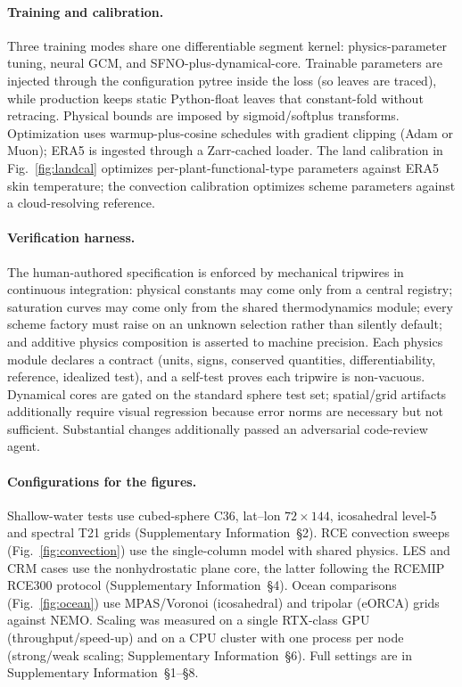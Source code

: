 \documentclass[11pt]{article}
\begin{document}
\paragraph{Training and calibration.}
Three training modes share one differentiable segment kernel: physics-parameter tuning, neural
GCM, and SFNO-plus-dynamical-core. Trainable parameters are injected through the configuration
pytree inside the loss (so leaves are traced), while production keeps static Python-float leaves
that constant-fold without retracing. Physical bounds are imposed by sigmoid/softplus transforms.
Optimization uses warmup-plus-cosine schedules with gradient clipping (Adam\cite{KingmaBa2015} or
Muon\cite{Jordan2024Muon}); ERA5\cite{Hersbach2020} is ingested through a Zarr-cached loader. The
land calibration in Fig.~\ref{fig:landcal} optimizes per-plant-functional-type parameters
against ERA5 skin temperature; the convection calibration optimizes scheme parameters against a
cloud-resolving reference.

\paragraph{Verification harness.}
The human-authored specification is enforced by mechanical tripwires in continuous integration:
physical constants may come only from a central registry; saturation curves may come only from
the shared thermodynamics module; every scheme factory must raise on an unknown selection rather
than silently default; and additive physics composition is asserted to machine precision. Each
physics module declares a contract (units, signs, conserved quantities, differentiability,
reference, idealized test), and a self-test proves each tripwire is non-vacuous. Dynamical cores
are gated on the standard sphere test set\cite{Williamson1992,JablonowskiWilliamson2006,HeldSuarez1994};
spatial/grid artifacts additionally require visual regression because error norms are necessary
but not sufficient. Substantial changes additionally passed an adversarial code-review agent.

\paragraph{Configurations for the figures.}
Shallow-water tests use cubed-sphere C36, lat--lon $72\times144$, icosahedral level-5 and
spectral T21 grids (Supplementary Information~\S2). RCE convection sweeps
(Fig.~\ref{fig:convection}) use the single-column model with shared physics. LES and CRM cases
use the nonhydrostatic plane core, the latter following the RCEMIP RCE300 protocol\cite{Wing2018}
(Supplementary Information~\S4). Ocean comparisons (Fig.~\ref{fig:ocean}) use MPAS/Voronoi
(icosahedral) and tripolar (eORCA) grids against NEMO\cite{Madec2017}. Scaling was measured on a
single RTX-class GPU (throughput/speed-up) and on a CPU cluster with one process per node
(strong/weak scaling; Supplementary Information~\S6). Full settings are in Supplementary
Information~\S1--\S8.
\end{document}
